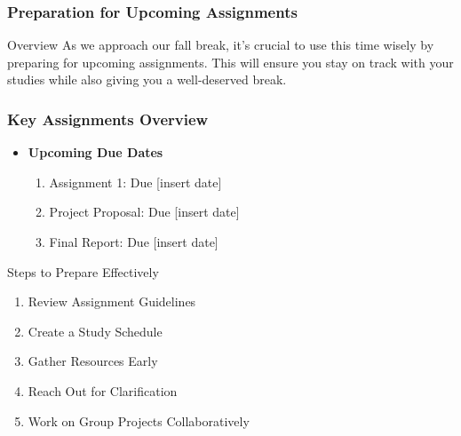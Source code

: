\documentclass[aspectratio=169]{beamer}
\begin{document}
\begin{frame}[fragile]
    \frametitle{Preparation for Upcoming Assignments}
    \begin{block}{Overview}
        As we approach our fall break, it's crucial to use this time wisely by preparing for upcoming assignments. This will ensure you stay on track with your studies while also giving you a well-deserved break.
    \end{block}
\end{frame}

\begin{frame}[fragile]
    \frametitle{Key Assignments Overview}
    \begin{itemize}
        \item \textbf{Upcoming Due Dates}
        \begin{enumerate}
            \item Assignment 1: Due [insert date]
            \item Project Proposal: Due [insert date]
            \item Final Report: Due [insert date]
        \end{enumerate}
    \end{itemize}
    
    \begin{block}{Steps to Prepare Effectively}
        \begin{enumerate}
            \item Review Assignment Guidelines
            \item Create a Study Schedule
            \item Gather Resources Early
            \item Reach Out for Clarification
            \item Work on Group Projects Collaboratively
        \end{enumerate}
    \end{block}
\end{frame}
\end{document}
